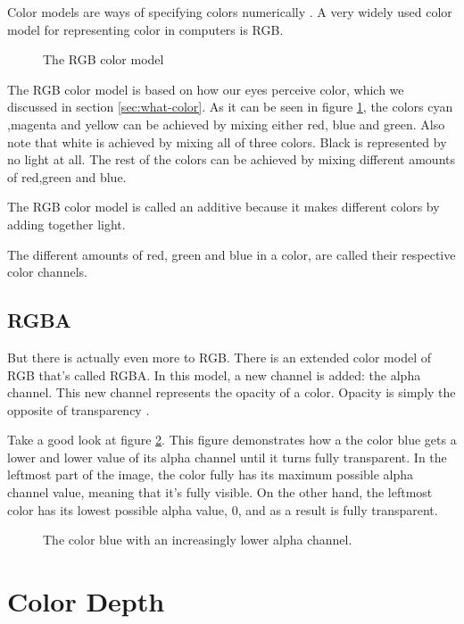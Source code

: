 Color models are ways of specifying colors
numerically \cite{fadgi11:color_model}. A very widely used color
model for representing color in computers is RGB.

\begin{figure}
  \centering
  \caption{The RGB color model}
  \label{fig:rgb}
\end{figure}

The RGB color model is based on how our eyes perceive color, which
we discussed in section \ref{sec:what-color}. As it can be seen in
figure \ref{fig:rgb}, the colors cyan ,magenta and yellow can be
achieved by mixing either red, blue and green. Also note that white
is achieved by mixing all of three colors. Black is represented by
no light at all. The rest of the colors can be achieved by mixing
different amounts of red,green and blue.

The RGB color model is called an additive
because it makes different colors by adding together light.

The different amounts of red, green and blue in a color, are called
their respective color channels.

\subsection{RGBA}

But there is actually even more to RGB. There is an extended color
model of RGB that's called RGBA. In this model, a new channel is
added: the alpha channel. This new channel
represents the opacity of a color. Opacity is simply the opposite of
transparency \cite{porter84_compos_dig_img}.

Take a good look at figure \ref{fig:alpha}. This figure demonstrates
how a the color blue gets a lower and lower value of its alpha
channel until it turns fully transparent. In the leftmost part of
the image, the color fully has its maximum possible alpha channel
value, meaning that it's fully visible. On the other hand, the
leftmost color has its lowest possible alpha value, $0$, and as a
result is fully transparent.

\begin{figure}
  \centering
  \caption{The color blue with an increasingly lower alpha channel.}
  \label{fig:alpha}
\end{figure}

\section{Color Depth}
\label{sec:color-depth}

